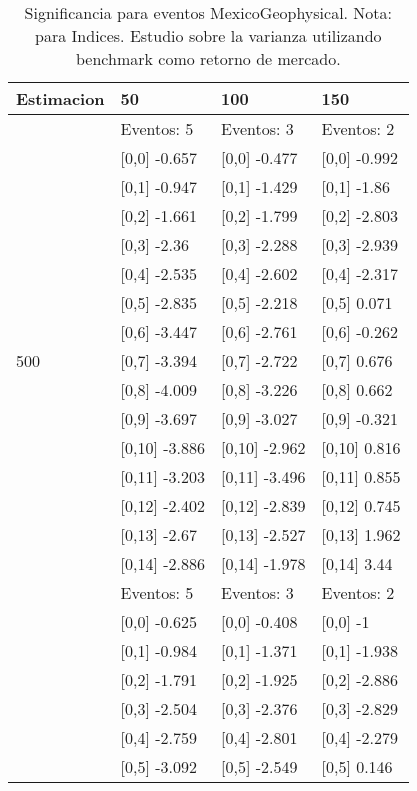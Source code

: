 \begin{table}

\caption{Significancia para eventos MexicoGeophysical. Nota: para Indices. Estudio sobre la varianza utilizando benchmark como retorno de mercado.}
\centering
\begin{tabular}[t]{llll}
\toprule
Estimacion & 50 & 100 & 150\\
\midrule
 & Eventos:  5 & Eventos:  3 & Eventos:  2\\
 & {}[0,0] -0.657 & {}[0,0] -0.477 & {}[0,0] -0.992\\
 & {}[0,1] -0.947 & {}[0,1] -1.429 & {}[0,1] -1.86\\
 & {}[0,2] -1.661 & {}[0,2] -1.799 & {}[0,2] -2.803\\
 & {}[0,3] -2.36 & {}[0,3] -2.288 & {}[0,3] -2.939\\
\addlinespace
 & {}[0,4] -2.535 & {}[0,4] -2.602 & {}[0,4] -2.317\\
 & {}[0,5] -2.835 & {}[0,5] -2.218 & {}[0,5] 0.071\\
 & {}[0,6] -3.447 & {}[0,6] -2.761 & {}[0,6] -0.262\\
500 & {}[0,7] -3.394 & {}[0,7] -2.722 & {}[0,7] 0.676\\
 & {}[0,8] -4.009 & {}[0,8] -3.226 & {}[0,8] 0.662\\
\addlinespace
 & {}[0,9] -3.697 & {}[0,9] -3.027 & {}[0,9] -0.321\\
 & {}[0,10] -3.886 & {}[0,10] -2.962 & {}[0,10] 0.816\\
 & {}[0,11] -3.203 & {}[0,11] -3.496 & {}[0,11] 0.855\\
 & {}[0,12] -2.402 & {}[0,12] -2.839 & {}[0,12] 0.745\\
 & {}[0,13] -2.67 & {}[0,13] -2.527 & {}[0,13] 1.962\\
\addlinespace
 & {}[0,14] -2.886 & {}[0,14] -1.978 & {}[0,14] 3.44\\
 & Eventos:  5 & Eventos:  3 & Eventos:  2\\
 & {}[0,0] -0.625 & {}[0,0] -0.408 & {}[0,0] -1\\
 & {}[0,1] -0.984 & {}[0,1] -1.371 & {}[0,1] -1.938\\
 & {}[0,2] -1.791 & {}[0,2] -1.925 & {}[0,2] -2.886\\
\addlinespace
 & {}[0,3] -2.504 & {}[0,3] -2.376 & {}[0,3] -2.829\\
 & {}[0,4] -2.759 & {}[0,4] -2.801 & {}[0,4] -2.279\\
 & {}[0,5] -3.092 & {}[0,5] -2.549 & {}[0,5] 0.146\\

\end{tabular}
\end{table}
